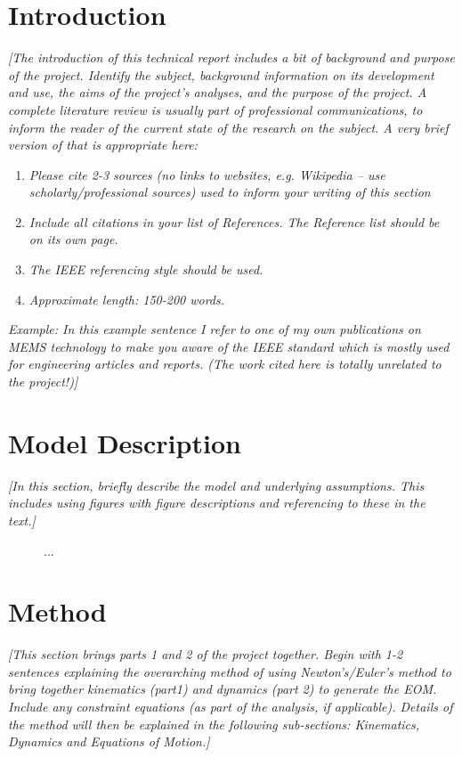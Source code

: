 \documentclass[11pt]{article}
\begin{document}
\section*{Introduction}
\textcolor[rgb]{0.80,0.29,0.09}{\textsl{[The introduction of this technical report includes a bit of background and purpose of the project. Identify the subject, background information on its development and use, the aims of the project’s analyses, and the purpose of the project. A complete literature review is usually part of professional communications, to inform the reader of the current state of the research on the subject. A very brief version of that is appropriate here:}}
\begin{enumerate}
  \item \textcolor[rgb]{0.80,0.29,0.09}{\textsl{Please cite 2-3 sources (no links to websites, e.g. Wikipedia – use scholarly/professional sources) used to inform your writing of this section}}
  \item \textcolor[rgb]{0.80,0.29,0.09}{\textsl{Include all citations in your list of References. The Reference list should be on its own page.}}
  \item \textcolor[rgb]{0.80,0.29,0.09}{\textsl{The IEEE referencing style should be used.}}
  \item \textcolor[rgb]{0.80,0.29,0.09}{\textsl{Approximate length: 150-200 words.}}
\end{enumerate}
\textcolor[rgb]{0.80,0.29,0.09}{\textsl{Example: In this example sentence I refer to one of my own publications on MEMS technology \cite{gutschmidt2024} to make you aware of the IEEE standard \cite{IEEE} which is mostly used for engineering articles and reports. (The work cited here is totally unrelated to the project!)]}}


\section*{Model Description}
\textcolor[rgb]{0.80,0.29,0.09}{\textsl{[In this section, briefly describe the model and underlying assumptions. This includes using figures with figure descriptions and referencing to these in the text.]}}

\begin{figure}[h!]
  \centering
  \caption{...}\label{fig:model}
\end{figure}

\section*{Method}\label{sec:method}
\textcolor[rgb]{0.80,0.29,0.09}{\textsl{[This section brings parts 1 and 2 of the project together. Begin with 1-2 sentences explaining the overarching method of using Newton’s/Euler’s method to bring together kinematics (part1) and dynamics (part 2) to generate the EOM.  Include any constraint equations (as part of the analysis, if applicable). Details of the method will then be explained in the following sub-sections: Kinematics, Dynamics and Equations of Motion.]}}
\end{document}
